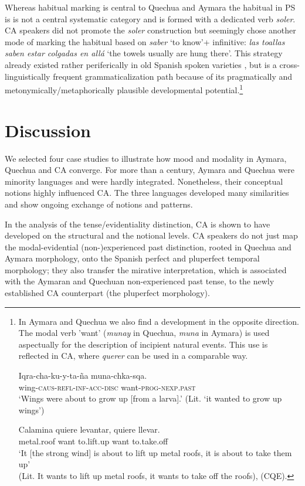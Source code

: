 \documentclass[output=paper,hidelinks]{langscibook}
\begin{document}
Whereas habitual marking is central to Quechua and Aymara the habitual in PS is is not a central systematic category and is formed with a dedicated verb \textit{soler}. CA speakers did not promote the \textit{soler} construction but seemingly chose another mode of marking the habitual based on \textit{saber} ‘to know’+ infinitive: \textit{las toallas saben estar colgadas en allá} ‘the towels usually are hung there’. This strategy already existed rather periferically in old Spanish spoken varieties \citep{pfander2009gramatica}, but is a cross-linguistically frequent grammaticalization path \citep{kouteva2019world} because of its pragmatically and metonymically/metaphorically plausible developmental potential.\footnote{In Aymara and Quechua we also find a development in the opposite direction. The modal verb 'want' (\textit{munay} in Quechua, \textit{muna} in Aymara) is used aspectually for the description of incipient natural events. This use is reflected in CA, where \textit{querer} can be used in a comparable way.

\ea \label{ex:larva}
\gll Iqra-cha-ku-y-ta-ña muna-chka-sqa. \\
wing-\textsc{caus-refl-inf-acc-disc} want-\textsc{prog-nexp.past} \\ \glt ‘Wings were about to grow up [from a larva].’ (Lit. `it wanted to grow up wings') \citep[75]{mamani2018kunanpi}
\z

\ea
\gll Calamina quiere levantar, quiere llevar. \\
metal.roof want to.lift.up want to.take.off \\ 
\glt `It [the strong wind] is about to lift up metal roofs, it is about to take them up'\\
(Lit. It wants to lift up metal roofs, it wants to take off the roofs), (CQE).
\zlast
}

\section{Discussion}

We selected four case studies to illustrate how mood and modality in Aymara, Quechua and CA converge. For more than a century, Aymara and Quechua were minority languages and were hardly integrated. Nonetheless, their conceptual notions highly influenced CA. The three languages developed many similarities and show ongoing exchange of notions and patterns. 

In the analysis of the tense/evidentiality distinction, CA is shown to have developed on the structural and the notional levels. CA speakers do not just map the modal-evidential (non-)experienced past distinction, rooted in Quechua and Aymara morphology, onto the Spanish perfect and pluperfect temporal morphology; they also transfer the mirative interpretation, which is associated with the Aymaran and Quechuan non-experienced past tense, to the newly established CA counterpart (the pluperfect morphology). 
\end{document}
